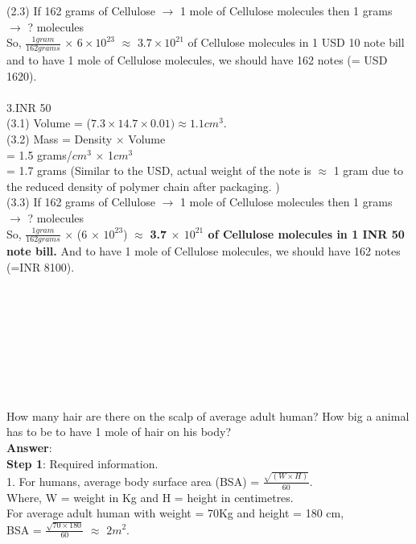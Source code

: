 \documentclass[11pt]{exam}
\begin{document}
\begin{questions}
{\begin{minipage}{42em}
 (2.3) If 162 grams of Cellulose $\rightarrow$ 1 mole of Cellulose molecules then 1 grams $\rightarrow$ ? molecules\\ 
                     
So, {$\frac{1 gram} {162 grams}$} $\times$  $6\times10^{23}$  $\approx$   \textbf{$3.7\times10^{21}$} of Cellulose molecules in 1 USD 10 note bill  and to have 1 mole of Cellulose molecules, we should have 162 notes (= USD 1620). \\ \\

3.INR 50 \\ 
(3.1) Volume = ($7.3 \times 14.7\times 0.01) \approx 1.1cm^{3}$.\\       
(3.2) Mass    = Density $\times$ Volume \\
                     = 1.5 grams/$cm^{3}$ $\times$ 1$cm^{3}$ \\
                     = 1.7 grams  (Similar to the USD, actual weight of the note is $\approx$ 1 gram due to the reduced density of polymer chain after packaging. )\\   
                     
(3.3) If 162 grams of Cellulose $\rightarrow$ 1 mole of Cellulose molecules then 1 grams $\rightarrow$ ? molecules\\ 

 So, $\frac{ 1 gram }{162 grams}$ $\times$ (6 $\times$ $10^{23}$) $\approx$ \textbf{3.7 $\times$ $10^{21}$ of Cellulose molecules in 1 INR 50 note bill.} And to have 1 mole of Cellulose molecules, we should have 162 notes (=INR 8100). \\ \\  

\end{minipage}}\\   \\ \\ \\ \\ \\               

  
  
\question
\label{Q3:Hair}

How many hair are there on the scalp of average adult human? How big a animal has to be to have 1 mole of hair on his body? \\
\textbf{Answer}: \\
\textbf{Step 1}: Required information.\\
                1. For humans, average body surface area (BSA)  = $\frac{\sqrt{(W \times H)}}
                   {60}$.\\
                   Where, W = weight in Kg and H = height in centimetres.\\
                   For average adult human with weight = 70Kg and height = 180 cm, \\
                   BSA = $\frac{\sqrt{70\times180}}{60}$ $\approx$ $2m^{2}$.\\
                   

\end{questions}
\end{document}

